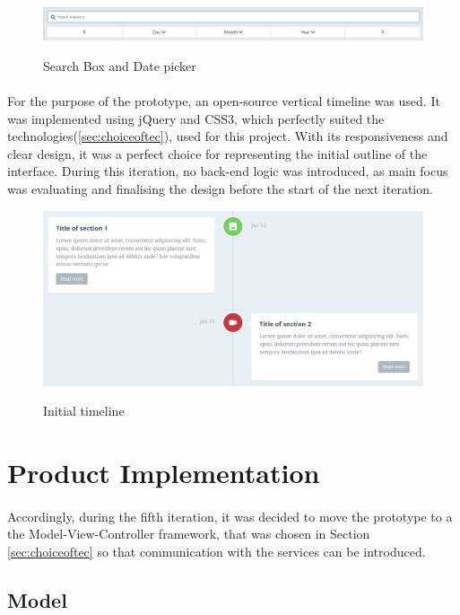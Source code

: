 \documentclass{l4proj}
\begin{document}
\begin{figure}[H]
	\centering
	\includegraphics[width=\textwidth]{images/searchboxwithdatepicker}
	\label{fig:searchbox}
	\caption{Search Box and Date picker}
\end{figure}

\paragraph{}
For the purpose of the prototype, an open-source vertical timeline was used. It was implemented using jQuery and CSS3, which perfectly suited the technologies(\ref{sec:choiceoftec}), used for this project. With its responsiveness and clear design, it was a perfect choice for representing the initial outline of the interface. During this iteration, no back-end logic was introduced, as main focus was evaluating and finalising the design before the start of the next iteration. 

\begin{figure}[H]
	\centering
	\includegraphics[width=.5\textwidth]{images/opensourcetimeline}
	\label{fig:opensourcetimeline}
	\caption{Initial timeline}
\end{figure}

\section{Product Implementation}
\paragraph{}
Accordingly, during the fifth iteration, it was decided to move the prototype to a the Model-View-Controller framework, that was chosen in Section \ref{sec:choiceoftec} so that communication with the services can be introduced.

\subsection{Model}
\end{document}
